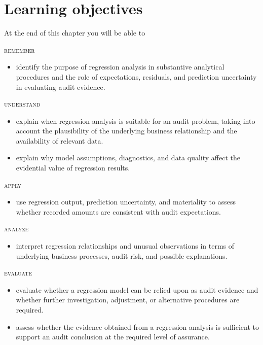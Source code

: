 \section*{Learning objectives}
At the end of this chapter you will be able to

\bigskip
\noindent \textsc{remember}

\begin{itemize}
\item identify the purpose of regression analysis in substantive analytical procedures and the role of expectations, residuals, and prediction uncertainty in evaluating audit evidence.
\end{itemize}

\noindent \textsc{understand}
\begin{itemize}
\item explain when regression analysis is suitable for an audit problem, taking into account the plausibility of the underlying business relationship and the availability of relevant data.
\item explain why model assumptions, diagnostics, and data quality affect the evidential value of regression results.
\end{itemize}

\noindent \textsc{apply}
\begin{itemize}
\item use regression output, prediction uncertainty, and materiality to assess whether recorded amounts are consistent with audit expectations.
\end{itemize}

\noindent \textsc{analyze}
\begin{itemize}
\item interpret regression relationships and unusual observations in terms of underlying business processes, audit risk, and possible explanations.
\end{itemize}

\noindent \textsc{evaluate}
\begin{itemize}
\item evaluate whether a regression model can be relied upon as audit evidence and whether further investigation, adjustment, or alternative procedures are required.
\item assess whether the evidence obtained from a regression analysis is sufficient to support an audit conclusion at the required level of assurance.
\end{itemize}

